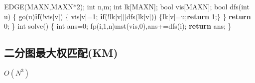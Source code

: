 \documentclass[
]{article}
\newenvironment{Shaded}{}{}
\newcommand{\ControlFlowTok}[1]{\textcolor[rgb]{0.00,0.44,0.13}{\textbf{#1}}}
\newcommand{\DataTypeTok}[1]{\textcolor[rgb]{0.56,0.13,0.00}{#1}}
\newcommand{\DecValTok}[1]{\textcolor[rgb]{0.25,0.63,0.44}{#1}}
\newcommand{\NormalTok}[1]{#1}
\begin{document}
\begin{Shaded}
\begin{Highlighting}[]
\NormalTok{EDGE(MAXN,MAXN*}\DecValTok{2}\NormalTok{);}
\DataTypeTok{int}\NormalTok{ n,m;}
\DataTypeTok{int}\NormalTok{ lk[MAXN];}
\DataTypeTok{bool}\NormalTok{ vis[MAXN];}
\DataTypeTok{bool}\NormalTok{ dfs(}\DataTypeTok{int}\NormalTok{ u)}
\NormalTok{\{}
\NormalTok{    go(u)}\ControlFlowTok{if}\NormalTok{(!vis[v])}
\NormalTok{    \{}
\NormalTok{        vis[v]=}\DecValTok{1}\NormalTok{;}
        \ControlFlowTok{if}\NormalTok{(!lk[v]||dfs(lk[v]))}
\NormalTok{            \{lk[v]=u;}\ControlFlowTok{return} \DecValTok{1}\NormalTok{;\}}
\NormalTok{    \}}
    \ControlFlowTok{return} \DecValTok{0}\NormalTok{;}
\NormalTok{\}}
\DataTypeTok{int}\NormalTok{ solve()}
\NormalTok{\{}
    \DataTypeTok{int}\NormalTok{ ans=}\DecValTok{0}\NormalTok{;}
\NormalTok{    fp(i,}\DecValTok{1}\NormalTok{,n)mst(vis,}\DecValTok{0}\NormalTok{),ans+=dfs(i);}
    \ControlFlowTok{return}\NormalTok{ ans;}
\NormalTok{\}}
\end{Highlighting}
\end{Shaded}

\hypertarget{ux4e8cux5206ux56feux6700ux5927ux6743ux5339ux914dkm}{%
\subsection{二分图最大权匹配(KM)}\label{ux4e8cux5206ux56feux6700ux5927ux6743ux5339ux914dkm}}

\(O(N^3)\)
\end{document}
